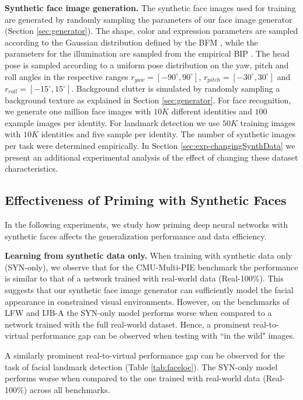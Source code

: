 \documentclass[10pt,twocolumn,letterpaper]{article}
\begin{document}
\begin{table}
    	\label{tab:faceloc}
    \end{table}\textbf{Synthetic face image generation.} The synthetic face images used for training are generated by randomly sampling the parameters of our face image generator (Section \ref{sec:generator}). The shape, color and expression parameters are sampled according to the Gaussian distribution defined by the BFM \cite{bfm17}, while the parameters for the illumination are sampled from the empirical BIP \cite{illuprior}. The head pose is sampled according to a uniform pose distribution on the yaw, pitch and roll angles in the respective ranges $r_{yaw}=[ -90^\circ,90^\circ ]$, $r_{pitch}=[ -30^\circ,30^\circ ]$ and $r_{roll}=[ -15^\circ,15^\circ ]$. Background clutter is simulated by randomly sampling a background texture as explained in Section \ref{sec:generator}. For face recognition, we generate one million face images with $10K$ different identities and $100$ example images per identity. For landmark detection we use $50K$ training images with $10K$ identities and five sample per identity. The number of synthetic images per task were determined empirically. In Section \ref{sec:exp-changingSynthData} we present an additional experimental analysis of the effect of changing these dataset characteristics. 	

\subsection{Effectiveness of Priming with Synthetic Faces}\label{sec:exp-gapclose}    
	In the following experiments, we study how priming deep neural networks with synthetic faces affects the generalization performance and data efficiency.
	
	\textbf{Learning from synthetic data only.} When training with synthetic data only (SYN-only), we observe that for the CMU-Multi-PIE benchmark the performance is similar to that of a network trained with real-world data (Real-100\%). This suggests that our synthetic face image generator can sufficiently model the facial appearance in constrained visual environments. However, on the benchmarks of LFW and IJB-A the SYN-only model performs worse when compared to a network trained with the full real-world dataset. Hence, a prominent real-to-virtual performance gap can be observed when testing with ``in the wild" images. 
	
	A similarly prominent real-to-virtual performance gap can be observed for the task of facial landmark detection (Table \ref{tab:faceloc}). The SYN-only model performs worse when compared to the one trained with real-world data (Real-100\%) across all benchmarks.
\end{document}
